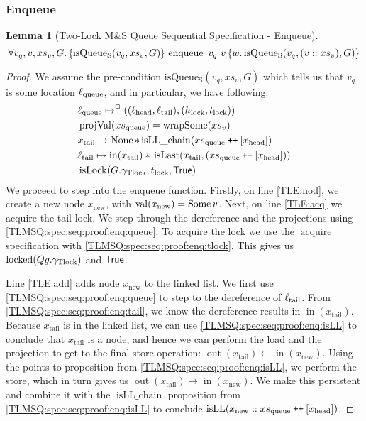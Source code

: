 \documentclass[a4paper, 10pt]{report}
\theoremstyle{definition}
\newtheorem{lemma}[theorem]{Lemma}
\newcommand{\isLock}{\operatorname{isLock}}
\newcommand{\locked}{\operatorname{locked}}
\newcommand{\acquire}{\operatorname{acquire}}
\newcommand{\enqueue}{\operatorname{enqueue}}
\newcommand{\msq}{M\&S Queue}
\newcommand{\tlmsq}{Two-Lock \msq{}}
\newcommand{\isqueueseq}{\operatorname{isQueue_{S}}}
\newcommand{\vq}{v_q}
\newcommand{\xsqueue}{xs_{\mathrm{queue}}}
\newcommand{\isLLchain}{\operatorname{isLL\_chain}}
\newcommand{\isLL}{\operatorname{isLL}}
\newcommand{\projval}{\operatorname{projVal}}
\newcommand{\wrapsome}{\operatorname{wrapSome}}
\newcommand{\isLast}{\operatorname{isLast}}
\newcommand{\locN}[1]{\loc_{\mathrm{#1}}}
\newcommand{\lochead}{\locN{head}}
\newcommand{\loctail}{\locN{tail}}
\newcommand{\locqueue}{\locN{queue}}
\newcommand{\nIn}[1]{\operatorname{in}(#1)}
\newcommand{\nVal}[1]{\operatorname{val}(#1)}
\newcommand{\nOut}[1]{\operatorname{out}(#1)}
\newcommand{\node}{x}
\newcommand{\nodeN}[1]{\node_{\mathrm{#1}}}
\newcommand{\nodehead}{\nodeN{head}}
\newcommand{\nodetail}{\nodeN{tail}}
\newcommand{\nodenew}{\nodeN{new}}
\newcommand{\absvalue}{\val}
\newcommand{\absvalueList}{xs_v}
\newcommand{\Hlock}{h_{\mathrm{lock}}}
\newcommand{\Tlock}{t_{\mathrm{lock}}}
\newcommand{\Qg}{G}
\newcommand{\gtlock}{\gname_{\mathrm{Tlock}}}
\newcommand\catenate{\mathbin{\text{\ttfamily\upshape ++}}}
\newcommand{\tlseqspecenqHT}[4]{\hoare{\isqueueseq(#1, #3, #4)}{\enqueue \ #1 \ #2}{\valB . \isqueueseq(#1, (#2 :: #3), #4)}}
\newcommand{\tlseqspecenqGen}[4]{\All #1, #2, #3, #4. \tlseqspecenqHT{#1}{#2}{#3}{#4}}
\newcommand{\tlseqspecenq}{\tlseqspecenqGen{\vq}{\absvalue}{\absvalueList}{\Qg}}
\begin{document}
\subsubsection{Enqueue}
\begin{lemma}[\tlmsq{} Sequential Specification - Enqueue]\label{TLMSQ:spec:seq:enqueue}
  \begin{equation*}
    \tlseqspecenq
  \end{equation*}
\end{lemma}
\begin{proof}
We assume the pre-condition $\isqueueseq(\vq, \absvalueList, \Qg)$ which tells us that $\vq$ is some location $\locqueue$, and in particular, we have following:
\begin{align}
  &\locqueue \mapsto^{\persistently} ((\lochead, \loctail), (\Hlock, \Tlock))\label{TLMSQ:spec:seq:proof:enq:queue}\\
  &\projval(\xsqueue) = \wrapsome(\absvalueList)\label{TLMSQ:spec:seq:proof:enq:rel}\\
  &\nodetail \mapsto \None \star{} \isLLchain (\xsqueue \catenate [\nodehead])\label{TLMSQ:spec:seq:proof:enq:isLL}\\
  &\loctail \mapsto \nIn{\nodetail} \star{} \isLast(\nodetail, (\xsqueue \catenate [\nodehead]))\label{TLMSQ:spec:seq:proof:enq:tail}\\
  &\isLock(\Qg.\gtlock, \Tlock, \TRUE)\label{TLMSQ:spec:seq:proof:enq:tlock}
\end{align} 
We proceed to step into the enqueue function. Firstly, on line \ref{TLE:nod}, we create a new node $\nodenew$, with $\nVal{\nodenew} = \Some \absvalue$. Next, on line \ref{TLE:acq} we acquire the tail lock. We step through the dereference and the projections using \ref{TLMSQ:spec:seq:proof:enq:queue}. To acquire the lock we use the $\acquire$ specification with \ref{TLMSQ:spec:seq:proof:enq:tlock}. This gives us $\locked(Qg.\gtlock)$ and $\textsf{True}$.

Line \ref{TLE:add} adds node $\nodenew$ to the linked list. We first use \ref{TLMSQ:spec:seq:proof:enq:queue} to step to the dereference of $\loctail$. From \ref{TLMSQ:spec:seq:proof:enq:tail}, we know the dereference results in $\nIn{\nodetail}$. Because $\nodetail$ is in the linked list, we can use \ref{TLMSQ:spec:seq:proof:enq:isLL} to conclude that $\nodetail$ is a node, and hence we can perform the load and the projection to get to the final store operation: $\nOut{\nodetail} \gets \nIn{\nodenew}$. Using the points-to proposition from \ref{TLMSQ:spec:seq:proof:enq:isLL}, we perform the store, which in turn gives us $\nOut{\nodetail} \mapsto \nIn{\nodenew}$. We make this persistent and combine it with the $\isLLchain$ proposition from \ref{TLMSQ:spec:seq:proof:enq:isLL} to conclude $\isLL(\nodenew :: \xsqueue \catenate [\nodehead])$.


\end{proof}
\end{document}
